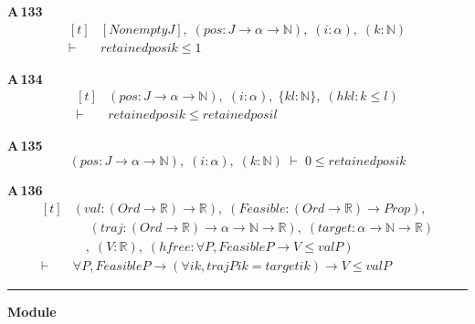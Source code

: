 \noindent\textbf{A\,133}\quad{}
{\footnotesize\[ \begin{aligned}[t]
&[\mathit{Nonempty} \mathit{J}],\; (\mathit{pos} : \mathit{J} \to \alpha \to \mathbb{N} ),\; (\mathit{i} : \alpha ),\; (\mathit{k} : \mathbb{N} )\\
\vdash\;&\mathit{retained} \mathit{pos} \mathit{i} \mathit{k} \leq 1
\end{aligned} \]}

\noindent\textbf{A\,134}\quad{}
{\footnotesize\[ \begin{aligned}[t]
&(\mathit{pos} : \mathit{J} \to \alpha \to \mathbb{N} ),\; (\mathit{i} : \alpha ),\; \{ \mathit{k} \mathit{l} : \mathbb{N} \},\; (\mathit{hkl} : \mathit{k} \leq \mathit{l})\\
\vdash\;&\mathit{retained} \mathit{pos} \mathit{i} \mathit{k} \leq \mathit{retained} \mathit{pos} \mathit{i} \mathit{l}
\end{aligned} \]}

\noindent\textbf{A\,135}\quad{}
{\footnotesize\[ (\mathit{pos} : \mathit{J} \to \alpha \to \mathbb{N} ),\; (\mathit{i} : \alpha ),\; (\mathit{k} : \mathbb{N} ) \;\vdash\; 0 \leq \mathit{retained} \mathit{pos} \mathit{i} \mathit{k} \]}

\noindent\textbf{A\,136}\quad{}
{\footnotesize\[ \begin{aligned}[t]
&(\mathit{val} : (\mathit{Ord} \to \mathbb{R} ) \to \mathbb{R} ),\; (\mathit{Feasible} : (\mathit{Ord} \to \mathbb{R} ) \to \mathit{Prop}),\\
&\quad \; (\mathit{traj} : (\mathit{Ord} \to \mathbb{R} ) \to \alpha \to \mathbb{N} \to \mathbb{R} ),\; (\mathit{target} : \alpha \to \mathbb{N} \to \mathbb{R} )\\
&\quad ,\; (\mathit{V} : \mathbb{R} ),\; (\mathit{hfree} : \forall \mathit{P}, \mathit{Feasible} \mathit{P} \to \mathit{V} \leq \mathit{val} \mathit{P})\\
\vdash\;&\forall \mathit{P}, \mathit{Feasible} \mathit{P} \to (\forall \mathit{i} \mathit{k}, \mathit{traj} \mathit{P} \mathit{i} \mathit{k} = \mathit{target} \mathit{i} \mathit{k}) \to \mathit{V} \leq \mathit{val} \mathit{P}
\end{aligned} \]}

\vspace{4pt}\noindent\rule{\columnwidth}{0.4pt}\par\vspace{2pt}
\noindent\textbf{Module }\par\vspace{3pt}

